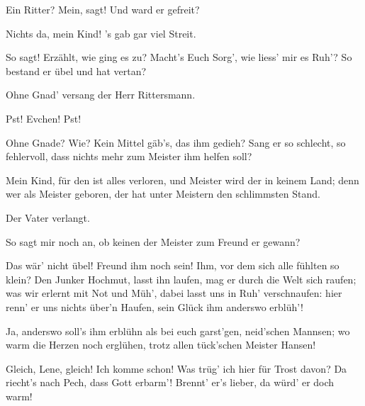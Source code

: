 \begin{drama}
\Evaspeaks


Ein Ritter? Mein, sagt!
Und ward er gefreit?

\Sachsspeaks
Nichts da, mein Kind! 's gab gar viel Streit.

\Evaspeaks
So sagt! Erzählt, wie ging es zu?
Macht's Euch Sorg', wie liess' mir es Ruh'?
So bestand er übel und hat vertan?

\Sachsspeaks
Ohne Gnad' versang der Herr Rittersmann.

\Magdalenespeaks


Pst! Evchen! Pst!

\Evaspeaks


Ohne Gnade? Wie?
Kein Mittel gäb's, das ihm gedieh?
Sang er so schlecht, so fehlervoll,
dass nichts mehr zum Meister ihm helfen soll?

\Sachsspeaks
Mein Kind, für den ist alles verloren,
und Meister wird der in keinem Land;
denn wer als Meister geboren,
der hat unter Meistern den schlimmsten Stand.

\Magdalenespeaks


Der Vater verlangt.

\Evaspeaks


So sagt mir noch an,
ob keinen der Meister zum Freund er gewann?

\Sachsspeaks
Das wär' nicht übel! Freund ihm noch sein!
Ihm, vor dem sich alle fühlten so klein?
Den Junker Hochmut, lasst ihn laufen,
mag er durch die Welt sich raufen;
was wir erlernt mit Not und Müh',
dabei lasst uns in Ruh' verschnaufen:
hier renn' er uns nichts über'n Haufen,
sein Glück ihm anderswo erblüh'!

\Evaspeaks


Ja, anderswo soll's ihm erblühn
als bei euch garst'gen, neid'schen Mannsen;
wo warm die Herzen noch erglühen,
trotz allen tück'schen Meister Hansen!


Gleich, Lene, gleich! Ich komme schon!
Was trüg' ich hier für Trost davon?
Da riecht's nach Pech, dass Gott erbarm'!
Brennt' er's lieber, da würd' er doch warm!


\end{drama}
